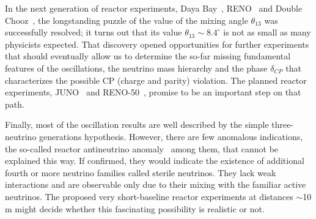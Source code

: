 In the next generation of reactor experiments, Daya Bay~\cite{Dayabay,Dayabay14}, RENO~\cite{Reno}  and Double Chooz~\cite{DChooz,DChooz14}, the longstanding puzzle of the
value of the mixing angle $\theta_{13}$ was successfully resolved; it turns out that its value $\theta_{13} \sim 8.4^\circ$
is not as small as many physicists expected. That discovery opened opportunities for further experiments that should eventually allow us to determine the so-far missing fundamental features of the oscillations, the neutrino mass hierarchy and the phase $\delta_{CP}$ that characterizes the possible CP (charge and parity) violation. 
The planned reactor experiments, JUNO~\cite{He-NuFact13} and RENO-50~\cite{RENO-50}, promise to be an important step on that path.

Finally, most of the oscillation results are well described by the simple three-neutrino generations hypothesis. However, there are few anomalous indications,
the so-called reactor antineutrino anomaly~\cite{Mention} among them, that cannot be explained this way. If confirmed, they would indicate the existence of additional
fourth or more neutrino families called sterile neutrinos. They lack weak interactions and are observable only due to their mixing with the familiar active neutrinos.  The proposed very short-baseline reactor experiments at distances $\sim$10 m might decide whether this fascinating possibility is realistic or not.
